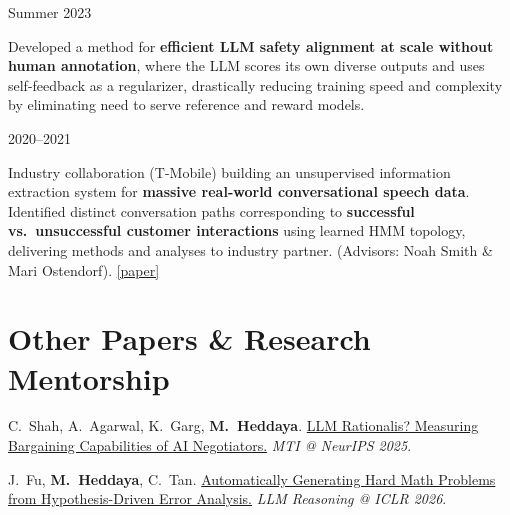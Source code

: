\documentclass[11pt,letterpaper]{article}
\begin{document}
\vspace{4pt}
 \hfill Summer 2023
\begin{cvitems}
    \item Developed a method for \textbf{efficient LLM safety alignment at scale without human annotation}, where the LLM scores its own diverse outputs and uses self-feedback as a regularizer, drastically reducing training speed and complexity by eliminating need to serve reference and reward models.
\end{cvitems}

\vspace{4pt}
 \hfill 2020--2021
\begin{cvitems}
    \item Industry collaboration (T-Mobile) building an unsupervised information extraction system for 
    \textbf{massive real-world conversational speech data}. Identified distinct conversation paths corresponding to \textbf{successful vs.\ unsuccessful customer interactions} using learned HMM topology, delivering methods and analyses to industry partner. (Advisors: Noah Smith \& Mari Ostendorf). \href{https://aclanthology.org/2022.findings-emnlp.415/}{[paper]}
\end{cvitems}

\section*{Other Papers \& Research Mentorship}

\begin{cvitems}
    \item C.\ Shah, A.\ Agarwal, K.\ Garg, \textbf{M.\ Heddaya}. \href{https://neurips.cc/virtual/2025/loc/san-diego/128019}{LLM Rationalis? Measuring Bargaining Capabilities of AI Negotiators.} \textit{MTI @ NeurIPS 2025}.
    \item J.\ Fu, \textbf{M.\ Heddaya}, C.\ Tan. \href{https://openreview.net/forum?id=d1PcXKaAON}{Automatically Generating Hard Math Problems from Hypothesis-Driven Error Analysis.} \textit{LLM Reasoning @ ICLR 2026}.
\end{cvitems}

\end{document}
